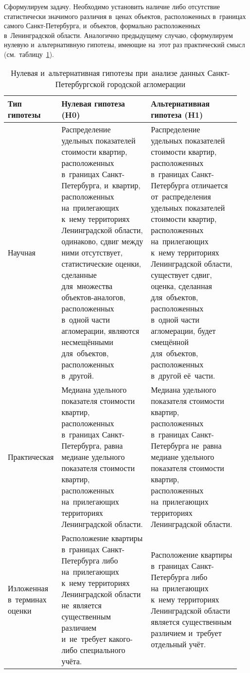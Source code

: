 \documentclass[]{scrartcl}
\begin{document}
Сформулируем задачу. Необходимо установить наличие либо отсутствие статистически значимого различия в~ценах объектов, расположенных в~границах самого Санкт-Петербурга, и~объектов, формально расположенных в~Ленинградской области. Аналогично предыдущему случаю, сформулируем нулевую и~альтернативную гипотезы, имеющие на~этот раз практический смысл (см.~таблицу~\ref{tab:nul-alt-hypothesis-SPba}).
\begin{table}[ht]
	\caption{Нулевая и~альтернативная гипотезы при~анализе данных Санкт-Петербургской городской агломерации}  \label{tab:nul-alt-hypothesis-SPba}
	\centering
	\begin{tabularx}{\textwidth}{p{0.15\linewidth} p{0.4\linewidth} p{0.4\linewidth}} 
		\hline
		Тип гипотезы&Нулевая гипотеза (H0)&Альтернативная гипотеза (H1)\\
		\hline
		Научная&Распределение удельных показателей стоимости квартир, расположенных в~границах Санкт-Петербурга, и~квартир, расположенных на~прилегающих к~нему территориях Ленинградской области, одинаково, сдвиг между ними отсутствует, статистические оценки, сделанные для~множества объектов-аналогов, расположенных в~одной части агломерации, являются несмещёнными для~объектов, расположенных в~другой.&Распределение удельных показателей стоимости квартир, расположенных в~границах Санкт-Петербурга отличается от~распределения удельных показателей стоимости квартир, расположенных на~прилегающих к~нему территориях Ленинградской области, существует сдвиг, оценка, сделанная для~объектов, расположенных в~одной части агломерации, будет смещённой для~объектов, расположенных в~другой её~части.\\
		\hline
		Практическая&Медиана удельного показателя стоимости квартир, расположенных в~границах Санкт-Петербурга, равна медиане удельного показателя стоимости квартир, расположенных на~прилегающих территориях Ленинградской области.&Медиана удельного показателя стоимости квартир, расположенных в~границах Санкт-Петербурга не~равна медиане удельного показателя стоимости квартир, расположенных на~прилегающих территориях Ленинградской области.\\
		\hline
		Изложенная в~терминах оценки&Расположение квартиры в~границах Санкт-Петербурга либо на~прилегающих к~нему территориях Ленинградской области не~является существенным различием и~не~требует какого-либо специального учёта.&Расположение квартиры в~границах Санкт-Петербурга либо на~прилегающих к~нему территориях Ленинградской области является существенным различием и~требует отдельный учёт.\\ \hline
	\end{tabularx}
\end{table}
\end{document}
